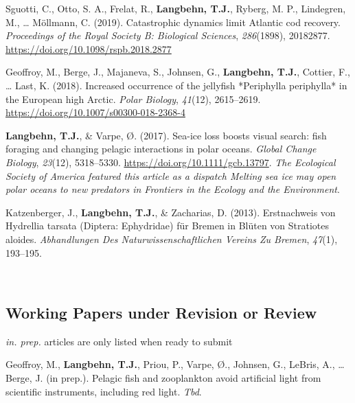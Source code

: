 \documentclass[11pt, a4paper]{awesome-cv}
\begin{document}
\leavevmode\hypertarget{ref-Sguotti}{}%
Sguotti, C., Otto, S. A., Frelat, R., \textbf{Langbehn, T.J.}, Ryberg,
M. P., Lindegren, M., \ldots{} Möllmann, C. (2019). Catastrophic
dynamics limit Atlantic cod recovery. \emph{Proceedings of the Royal
Society B: Biological Sciences}, \emph{286}(1898), 20182877.
\url{https://doi.org/10.1098/rspb.2018.2877}

\leavevmode\hypertarget{ref-Geoffroy2018}{}%
Geoffroy, M., Berge, J., Majaneva, S., Johnsen, G.,
\textbf{Langbehn, T.J.}, Cottier, F., \ldots{} Last, K. (2018).
Increased occurrence of the jellyfish *Periphylla periphylla* in the
European high Arctic. \emph{Polar Biology}, \emph{41}(12), 2615--2619.
\url{https://doi.org/10.1007/s00300-018-2368-4}

\leavevmode\hypertarget{ref-Langbehn2017}{}%
\textbf{Langbehn, T.J.}, \& Varpe, Ø. (2017). Sea-ice loss boosts visual
search: fish foraging and changing pelagic interactions in polar oceans.
\emph{Global Change Biology}, \emph{23}(12), 5318--5330.
\url{https://doi.org/10.1111/gcb.13797}. \emph{The Ecological Society of
America featured this article as a dispatch Melting sea ice may open
polar oceans to new predators in Frontiers in the Ecology and the
Environment}.

\leavevmode\hypertarget{ref-Katzenberger2013}{}%
Katzenberger, J., \textbf{Langbehn, T.J.}, \& Zacharias, D. (2013).
Erstnachweis von Hydrellia tarsata (Diptera: Ephydridae) für Bremen in
Blüten von Stratiotes aloides. \emph{Abhandlungen Des
Naturwissenschaftlichen Vereins Zu Bremen}, \emph{47}(1), 193--195.

\endgroup

~

\hypertarget{working-papers-under-revision-or-review}{%
\subsection{Working Papers under Revision or
Review}\label{working-papers-under-revision-or-review}}

\emph{in. prep.} articles are only listed when ready to submit

\begingroup
\setlength{\parindent}{-0.5in}
\setlength{\leftskip}{0.5in}

\hypertarget{refs_working_paper}{}
\leavevmode\hypertarget{ref-Geoffroy}{}%
Geoffroy, M., \textbf{Langbehn, T.J.}, Priou, P., Varpe, Ø., Johnsen,
G., LeBris, A., \ldots{} Berge, J. (in prep.). Pelagic fish and
zooplankton avoid artificial light from scientific instruments,
including red light. \emph{Tbd}.
\end{document}

